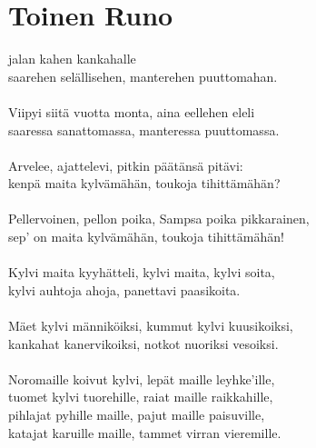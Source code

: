 
\chapter*{Toinen Runo}

 jalan kahen kankahalle				\\
saarehen selällisehen, manterehen puuttomahan.                  \\
                                                                \\
Viipyi siitä vuotta monta, aina eellehen eleli                  \\
saaressa sanattomassa, manteressa puuttomassa.                  \\
                                                                \\
Arvelee, ajattelevi, pitkin päätänsä pitävi:                    \\
kenpä maita kylvämähän, toukoja tihittämähän?                   \\
                                                                \\
Pellervoinen, pellon poika, Sampsa poika pikkarainen,           \\
sep' on maita kylvämähän, toukoja tihittämähän!                 \\
                                                                \\
Kylvi maita kyyhätteli, kylvi maita, kylvi soita,               \\
kylvi auhtoja ahoja, panettavi paasikoita.                      \\
                                                                \\
Mäet kylvi männiköiksi, kummut kylvi kuusikoiksi,               \\
kankahat kanervikoiksi, notkot nuoriksi vesoiksi.               \\
                                                                \\
Noromaille koivut kylvi, lepät maille leyhke'ille,              \\
tuomet kylvi tuorehille, raiat maille raikkahille,              \\
pihlajat pyhille maille, pajut maille paisuville,               \\
katajat karuille maille, tammet virran vieremille.              \\
